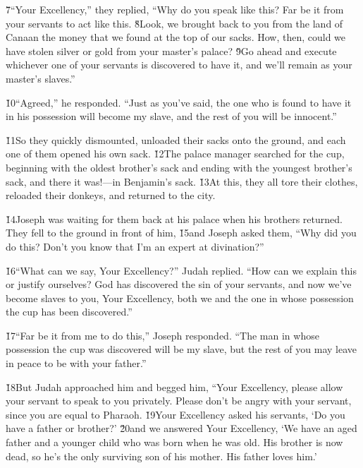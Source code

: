 \v{7}``Your Excellency,'' they replied, ``Why do you speak like this? Far be it from your servants to act like this. \v{8}Look, we brought back to you from the land of Canaan the money that we found at the top of our sacks. How, then, could we have stolen silver or gold from your master's palace? \v{9}Go ahead and execute whichever one of your servants is discovered to have it, and we'll remain as your master's slaves.''

\v{10}``Agreed,'' he responded. ``Just as you've said, the one who is found to have it in his possession will become my slave, and the rest of you will be innocent.''

\v{11}So they quickly dismounted, unloaded their sacks onto the ground, and each one of them opened his own sack. \v{12}The palace manager searched for the cup, beginning with the oldest brother's sack and ending with the youngest brother's sack, and there it was!---in Benjamin's sack. \v{13}At this, they all tore their clothes, reloaded their donkeys, and returned to the city.

\v{14}Joseph was waiting for them back at his palace when his brothers returned. They fell to the ground in front of him, \v{15}and Joseph asked them, ``Why did you do this? Don't you know that I'm an expert at divination?''

\v{16}``What can we say, Your Excellency?'' Judah replied. ``How can we explain this or justify ourselves? God has discovered the sin of your servants, and now we've become slaves to you, Your Excellency, both we and the one in whose possession the cup has been discovered.''

\v{17}``Far be it from me to do this,'' Joseph responded. ``The man in whose possession the cup was discovered will be my slave, but the rest of you may leave in peace to be with your father.''

\v{18}But Judah approached him and begged him, ``Your Excellency, please allow your servant to speak to you privately. Please don't be angry with your servant, since you are equal to Pharaoh. \v{19}Your Excellency asked his servants, `Do you have a father or brother?' \v{20}and we answered Your Excellency, `We have an aged father and a younger child who was born when he was old. His brother is now dead, so he's the only surviving son of his mother. His father loves him.'

